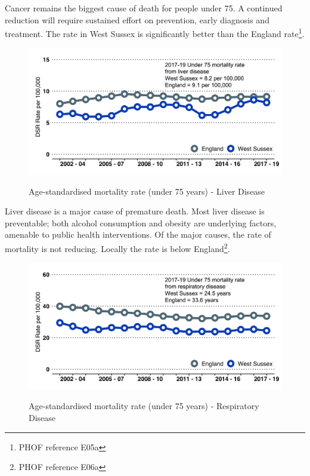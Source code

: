Cancer remains the biggest cause of death for people under 75. A continued reduction will require sustained effort on prevention, early diagnosis and treatment. The rate in West Sussex is significantly better than the England rate\footnote{PHOF reference E05a}.

\begin{figure}[htp]
    \caption[Age-standardised mortality rate (under 75 years) - Liver Disease]{Age-standardised mortality rate (under 75 years) - Liver Disease}
    \centering
    \includegraphics[width=.95\linewidth]{images/u75_liver_line_3y.png}
    \label{fig:u75_liver_b}
\end{figure}

Liver disease is a major cause of premature death. Most liver disease is preventable; both alcohol consumption and obesity are underlying factors, amenable to public health interventions. Of the major causes, the rate of mortality is not reducing. Locally the rate is below England\footnote{PHOF reference E06a}. 

\begin{figure}[htp]
    \caption[Age-standardised mortality rate (under 75 years) - Respiratory Disease]{Age-standardised mortality rate (under 75 years) - Respiratory Disease}
    \centering
    \includegraphics[width=.95\linewidth]{images/u75_respiratory_line_3y.png}
    \label{fig:u75_resp}
\end{figure}


